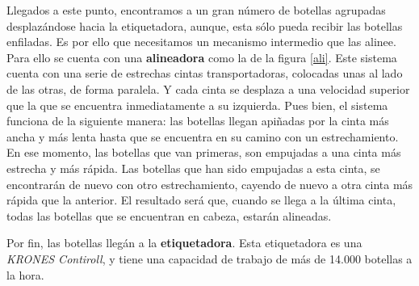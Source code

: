 \documentclass[11pt,a4paper,spanish,twoside]{report}
\begin{document}
Llegados a este punto, encontramos a un gran número de botellas agrupadas 
desplazándose hacia la etiquetadora, aunque, esta sólo pueda recibir las 
botellas enfiladas. Es por ello que necesitamos un mecanismo intermedio que 
las alinee. Para ello se cuenta con una \textbf{alineadora} como la de la
figura \ref{ali}. Este sistema cuenta con una serie de estrechas cintas
transportadoras, colocadas unas al lado de las otras, de forma paralela. Y
cada cinta se des\-pla\-za a una velocidad superior que la que se encuentra
inmediatamente a su izquierda. Pues bien, el sistema funciona de la siguiente
manera: las botellas llegan apiñadas por la cinta más ancha y más lenta hasta
que se encuentra en su camino con un estrechamiento. En ese momento, las
bo\-te\-llas que van primeras, son empujadas a una cinta más estrecha y más
rápida. Las bo\-te\-llas que han sido empujadas a esta cinta, se encontrarán de
nuevo con otro estrechamiento, cayendo de nuevo a otra cinta más rápida que
la anterior. El resultado será que, cuando se  llega a la última cinta, todas
las botellas que se encuentran en cabeza, estarán alineadas. 


Por fin, las botellas llegán a la \textbf{etiquetadora}. Esta etiquetadora es 
una \emph{KRONES Contiroll}, y tiene una capacidad de trabajo de más de 14.000 
botellas a la hora.
\end{document}
